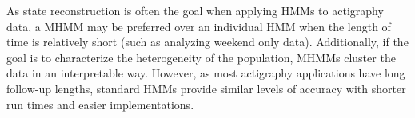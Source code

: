 \documentclass[num-refs]{wiley-article}
\begin{document}
As state reconstruction is often the goal when applying HMMs to actigraphy data, a MHMM may be preferred over an individual HMM when the length of time is relatively short (such as analyzing weekend only data). Additionally, if the goal is to characterize the heterogeneity of the population, MHMMs cluster the data in an interpretable way.  However, as most actigraphy applications have long follow-up lengths, standard HMMs provide similar levels of accuracy with shorter run times and easier implementations. 



\end{document}
